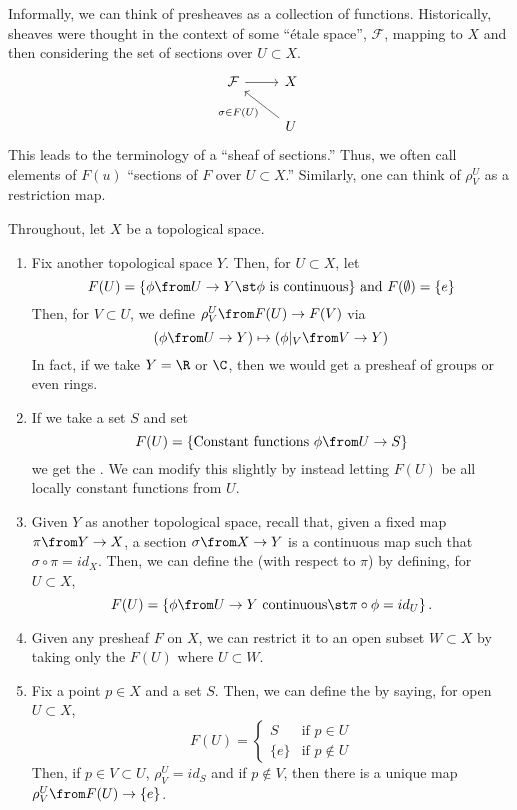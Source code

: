 \documentclass[11pt,leqno,oneside]{amsbook}
\renewcommand{\F}{F} %
\newcommand{\cF}{\mathcal{F}}
\numberwithin{thm}{section}
\begin{document}
Informally, we can think of presheaves as a collection of
functions. Historically, sheaves were thought in the context of some
``\'{e}tale space'', \(\cF\), mapping to \(X\) and then considering
the set of sections over \(U \subset X\). \[ 
  \begin{tikzcd}
    \cF \ar[r] & X\\
    & \ar[ul, "\sigma \in \F(U)"] U
  \end{tikzcd}
\]
This leads to the terminology of a ``sheaf of sections.'' Thus, we
often call elements of \(\F(u)\) ``sections of \(\F\) over \(U \subset
X\).'' Similarly, one can think of \(\rho_V^U\) as a restriction map.
\begin{example}
  Throughout, let \(X\) be a topological space.
  \begin{enumerate}
  \item Fix another topological space \(Y\). Then, for \(U \subset
    X\), let \[
      F(U) = \{\phi \from U \to Y \st \phi \text{ is continuous} \}
      \text{ and } F(\emptyset) = \{e\} 
    \]
    Then, for \(V \subset U\), we define \(\rho_V^U \from F(U) \to
    F(V)\) via \[
      (\phi \from U \to Y) \mapsto (\phi |_V \from V \to Y)
    \]
    In fact, if we take \(Y=\R\) or \(\C\), then we would get a
    presheaf of groups or even rings.
  \item If we take a set \(S\) and set \[
      F(U) = \{\text{Constant functions }\phi \from U \to S\}
    \]
    we get the . We can modify this slightly by
    instead letting \(F(U)\) be all locally constant functions from
    \(U\).
  \item Given \(Y\) as another topological space, recall that, given a
    fixed map \(\pi \from Y \to X\), a section \(\sigma \from X \to Y\) is a
    continuous map such that \(\sigma \circ \pi = id_X\). Then, we can
    define the  (with respect to \(\pi\)) by defining, for
    \(U \subset X\), \[
      F(U) = \{\phi \from U \to Y \text{ continuous} \st \pi \circ
      \phi = id_U\}\,.
    \]
  \item Given any presheaf \(F\) on \(X\), we can restrict it to an
    open subset \(W \subset X\) by taking only the \(F(U)\) where \(U
    \subset W\).
  \item Fix a point \(p \in X\) and a set \(S\). Then, we can define
    the  by saying, for open \(U \subset
    X\), \[
      F(U) =
      \begin{cases}
        S & \text{if }p \in U\\
        \{e\} & \text{if }p \not\in U
      \end{cases}
    \]
    Then, if \(p \in V \subset U\), \(\rho^U_V = id_S\) and if \(p
    \not \in V\), then there is a unique map \(\rho^U_V \from F(U) \to
    \{e\}\).
  \end{enumerate}
\end{example}
\end{document}

